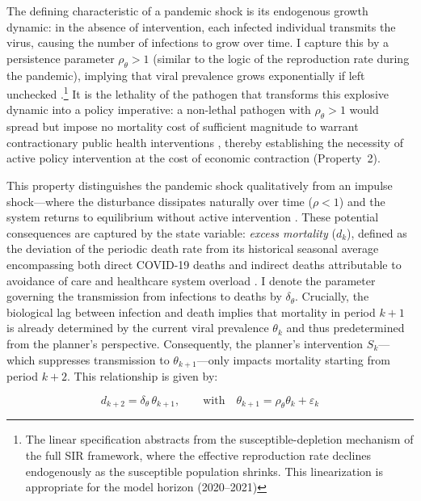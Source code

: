 \documentclass[12pt, a4paper]{article}
\begin{document}
The defining characteristic of a pandemic shock is its endogenous growth dynamic: in the absence of intervention, each infected individual transmits the virus, causing the number of infections to grow over time. I capture this by a persistence parameter $\rho_\theta > 1$ (similar to the logic of the reproduction rate during the pandemic), implying that viral prevalence grows exponentially if left unchecked \citep{Atkeson2020, alvarez2021, eichenbaum2021macro}.\footnote{The linear specification abstracts from the susceptible-depletion mechanism of the full SIR framework, where the effective reproduction rate declines endogenously as the susceptible population shrinks. This linearization is appropriate for the model horizon (2020--2021)} It is the lethality of the pathogen that transforms this explosive dynamic into a policy imperative: a non-lethal pathogen with $\rho_\theta > 1$ would spread but impose no mortality cost of sufficient magnitude to warrant contractionary public health interventions \citep{Jones2021, Barro2020}, thereby establishing the necessity of active policy intervention at the cost of economic contraction (Property~2).

This property distinguishes the pandemic shock qualitatively from an impulse shock---where the disturbance dissipates naturally over time ($\rho < 1$) and the system returns to equilibrium without active intervention \citep{jorda2022longer}. These potential consequences are captured by the state variable: \textit{excess mortality} ($d_k$), defined as the deviation of the periodic death rate from its historical seasonal average encompassing both direct COVID-19 deaths and indirect deaths attributable to avoidance of care and healthcare system overload \citep{Msemburi2023WHO, owid_em}. I denote the parameter governing the transmission from infections to deaths by $\delta_\theta$. Crucially, the biological lag between infection and death implies that mortality in period $k+1$ is already determined by the current viral prevalence $\theta_k$ and thus predetermined from the planner's perspective. Consequently, the planner's intervention $S_k$---which suppresses transmission to $\theta_{k+1}$---only impacts mortality starting from period $k+2$. This relationship is given by:

\begin{equation}
    d_{k+2} = \delta_\theta \, \theta_{k+1}, \qquad \text{with} \quad \theta_{k+1} = \rho_\theta \theta_k+\varepsilon_k
    \label{eq:mortality_intro}
\end{equation}
\end{document}
